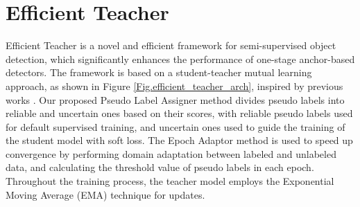 \documentclass[10pt,twocolumn,letterpaper]{article}
\begin{document}
\section{Efficient Teacher}
\label{sec:Method}
Efficient Teacher is a novel and efficient framework for semi-supervised object detection, which significantly enhances the performance of one-stage anchor-based detectors. The framework is based on a student-teacher mutual learning approach, as shown in Figure \ref{Fig.efficient_teacher_arch}, inspired by previous works \cite{xu2021end,chen2022label,chen2022dense,liu2021unbiased}. Our proposed Pseudo Label Assigner method divides pseudo labels into reliable and uncertain ones based on their scores, with reliable pseudo labels used for default supervised training, and uncertain ones used to guide the training of the student model with soft loss. The Epoch Adaptor method is used to speed up convergence by performing domain adaptation between labeled and unlabeled data, and calculating the threshold value of pseudo labels in each epoch. Throughout the training process, the teacher model employs the Exponential Moving Average (EMA) technique for updates.
\end{document}
